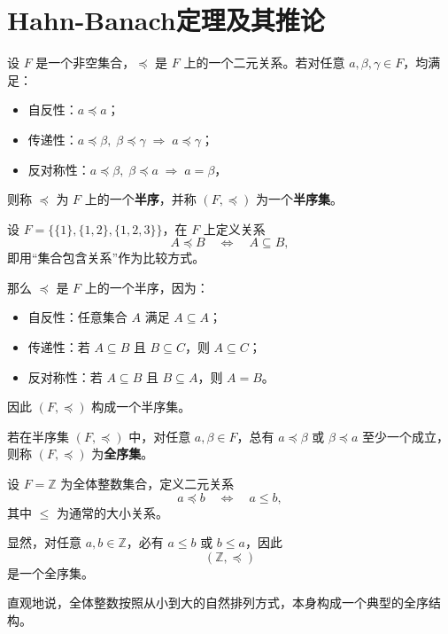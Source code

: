 \section{Hahn-Banach定理及其推论}
\begin{definition}[半序]
设 $F$ 是一个非空集合，$\preceq$ 是 $F$ 上的一个二元关系。若对任意 $a,\beta,\gamma\in F$，均满足：

\begin{itemize}
  \item[(1)] 自反性：$a\preceq a$；
  \item[(2)] 传递性：$a\preceq \beta,\; \beta\preceq \gamma \;\Rightarrow\; a\preceq \gamma$；
  \item[(3)] 反对称性：$a\preceq \beta,\; \beta\preceq a \;\Rightarrow\; a=\beta$，
\end{itemize}

则称 $\preceq$ 为 $F$ 上的一个\textbf{半序}，并称 $(F,\preceq)$ 为一个\textbf{半序集}。
\end{definition}
\begin{example}
设 $F=\{\{1\},\{1,2\},\{1,2,3\}\}$，在 $F$ 上定义关系
\[
A \preceq B \quad \Longleftrightarrow\quad A\subseteq B ,
\]
即用“集合包含关系”作为比较方式。

那么 $\preceq$ 是 $F$ 上的一个半序，因为：

\begin{itemize}
  \item 自反性：任意集合 $A$ 满足 $A\subseteq A$；
  \item 传递性：若 $A\subseteq B$ 且 $B\subseteq C$，则 $A\subseteq C$；
  \item 反对称性：若 $A\subseteq B$ 且 $B\subseteq A$，则 $A=B$。
\end{itemize}

因此 $(F,\preceq)$ 构成一个半序集。
\end{example}
\begin{definition}[全序]
若在半序集 $(F,\preceq)$ 中，对任意 $a,\beta\in F$，总有 $a\preceq \beta$ 或 $\beta\preceq a$ 至少一个成立，则称 $(F,\preceq)$ 为\textbf{全序集}。
\end{definition}
\begin{example}
设 $F=\mathbb{Z}$ 为全体整数集合，定义二元关系
\[
a \preccurlyeq b \quad \Longleftrightarrow \quad a \le b,
\]
其中 $\le$ 为通常的大小关系。

显然，对任意 $a,b\in\mathbb{Z}$，必有 $a\le b$ 或 $b\le a$，因此
\[
(\mathbb{Z},\preccurlyeq)
\]
是一个全序集。

直观地说，全体整数按照从小到大的自然排列方式，本身构成一个典型的全序结构。
\end{example}

